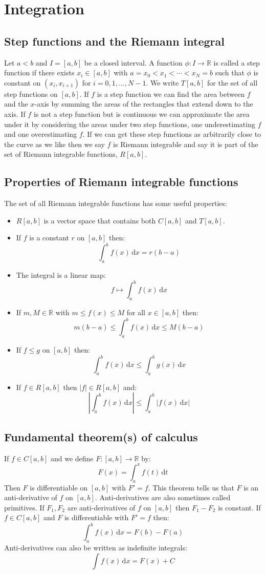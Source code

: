 \documentclass[12pt]{article}
\begin{document}
\section{Integration}
\subsection*{Step functions and the Riemann integral}
Let \(a<b\) and \(I=[a,b]\) be a closed interval. A function \(\phi:I\to\mathbb{R}\) is called a step function if there exists \(x_i\in[a,b]\) with \(a=x_0<x_1<\cdots<x_N=b\) such that \(\phi\) is constant on \((x_i,x_{i+1})\) for \(i=0,1,...,N-1\). We write \(T[a,b]\) for the set of all step functions on \([a,b]\). If \(f\) is a step function we can find the area between \(f\) and the \(x\)-axis by summing the areas of the rectangles that extend down to the axis. If \(f\) is not a step function but is continuous we can approximate the area under it by considering the areas under two step functions, one underestimating \(f\) and one overestimating \(f\). If we can get these step functions as arbitrarily close to the curve as we like then we say \(f\) is Riemann integrable and say it is part of the set of Riemann integrable functions, \(R[a,b]\).
\subsection*{Properties of Riemann integrable functions}
The set of all Riemann integrable functions has some useful properties:
\begin{itemize}
    \item \(R[a,b]\) is a vector space that contains both \(C[a,b]\) and \(T[a,b]\).
    \item If \(f\) is a constant \(r\) on \([a,b]\) then:
    \[\int^b_af(x)\,\text{d}x=r(b-a)\]
    \item The integral is a linear map:
    \[f\mapsto\int^b_af(x)\,\text{d}x\]
    \item If \(m,M\in\mathbb{R}\) with \(m\leq f(x)\leq M\) for all \(x\in[a,b]\) then:
    \[m(b-a)\leq \int^b_af(x)\,\text{d}x\leq M(b-a)\]
    \item If \(f\leq g\) on \([a,b]\) then:
    \[\int^b_af(x)\,\text{d}x\leq\int^b_ag(x)\,\text{d}x\]
    \item If \(f\in R[a,b]\) then \(|f|\in R[a,b]\) and:
    \[\left|\int^b_af(x)\,\text{d}x\right|\leq \int^b_a|f(x)\,\text{d}x|\]
\end{itemize}
\subsection*{Fundamental theorem(s) of calculus}
If \(f\in C[a,b]\) and we define \(F:[a,b]\to\mathbb{R}\) by:
\[F(x)=\int^x_af(t)\,\text{d}t\]
Then \(F\) is differentiable on \([a,b]\) with \(F'=f\). This theorem tells us that \(F\) is an anti-derivative of \(f\) on \([a,b]\). Anti-derivatives are also sometimes called primitives. If \(F_1,F_2\) are anti-derivatives of \(f\) on \([a,b]\) then \(F_1-F_2\) is constant. If \(f\in C[a,b]\) and \(F\) is differentiable with \(F'=f\) then:
\[\int^b_af(x)\,\text{d}x=F(b)-F(a)\]
Anti-derivatives can also be written as indefinite integrals:
\[\int f(x)\,\text{d}x=F(x)+C\]
\end{document}
